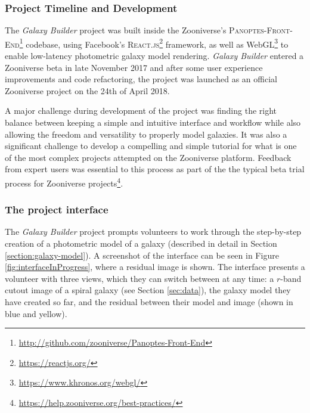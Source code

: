 \documentclass[../main.tex]{subfiles}
\begin{document}
\subsubsection{Project Timeline and Development}

The \textit{Galaxy Builder} project was built inside the Zooniverse's \citep{Simpson:2014:ZOW:2567948.2579215} \textsc{Panoptes-Front-End}\footnote{\url{http://github.com/zooniverse/Panoptes-Front-End}} codebase, using Facebook's \textsc{React.js}\footnote{\url{https://reactjs.org/}} framework, as well as WebGL\footnote{\url{https://www.khronos.org/webgl/}} to enable low-latency photometric galaxy model rendering. \textit{Galaxy Builder} entered a Zooniverse beta in late November 2017 and after some user experience improvements and code refactoring, the project was launched as an official Zooniverse project on the 24th of April 2018.

A major challenge during development of the project was finding the right balance between keeping a simple and intuitive interface and workflow while also allowing the freedom and versatility to properly model galaxies. It was also a significant challenge to develop a compelling and simple tutorial for what is one of the most complex projects attempted on the Zooniverse platform. Feedback from expert users was essential to this process as part of the the typical beta trial process for Zooniverse projects\footnote{\url{https://help.zooniverse.org/best-practices/}}.


\subsubsection{The project interface}

The \textit{Galaxy Builder} project prompts volunteers to work through the step-by-step creation of a photometric model of a galaxy (described in detail in Section \ref{section:galaxy-model}). A screenshot of the interface can be seen in Figure \ref{fig:interfaceInProgress}, where a residual image is shown. The interface presents a volunteer with three views, which they can switch between at any time: a $r$-band cutout image of a spiral galaxy (see Section \ref{sec:data}), the galaxy model they have created so far, and the residual between their model and image (shown in blue and yellow).
\end{document}
